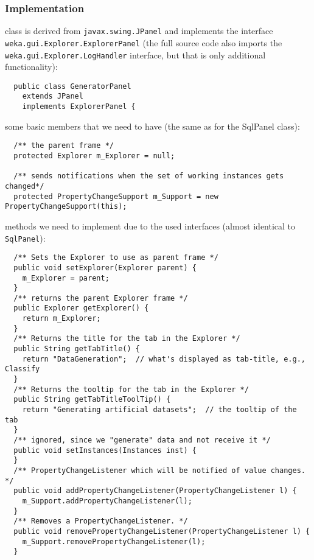 \subsubsection*{Implementation}
\begin{tight_itemize}
  \item class is derived from \texttt{javax.swing.JPanel} and implements the
interface \texttt{weka.gui.Explorer.ExplorerPanel} (the full source code also
imports the \texttt{weka.gui.Explorer.LogHandler} interface, but that is only
additional functionality):
  \begin{verbatim}
  public class GeneratorPanel
    extends JPanel
    implements ExplorerPanel {
  \end{verbatim}

  \item some basic members that we need to have (the same as for the SqlPanel
class):
  \begin{verbatim}
  /** the parent frame */
  protected Explorer m_Explorer = null;

  /** sends notifications when the set of working instances gets changed*/
  protected PropertyChangeSupport m_Support = new PropertyChangeSupport(this);
  \end{verbatim}

  \item methods we need to implement due to the used interfaces (almost
identical to \texttt{SqlPanel}):
  \begin{verbatim}
  /** Sets the Explorer to use as parent frame */
  public void setExplorer(Explorer parent) {
    m_Explorer = parent;
  }
  /** returns the parent Explorer frame */
  public Explorer getExplorer() {
    return m_Explorer;
  }
  /** Returns the title for the tab in the Explorer */
  public String getTabTitle() {
    return "DataGeneration";  // what's displayed as tab-title, e.g., Classify
  }
  /** Returns the tooltip for the tab in the Explorer */
  public String getTabTitleToolTip() {
    return "Generating artificial datasets";  // the tooltip of the tab
  }
  /** ignored, since we "generate" data and not receive it */
  public void setInstances(Instances inst) {
  }
  /** PropertyChangeListener which will be notified of value changes. */
  public void addPropertyChangeListener(PropertyChangeListener l) {
    m_Support.addPropertyChangeListener(l);
  }
  /** Removes a PropertyChangeListener. */
  public void removePropertyChangeListener(PropertyChangeListener l) {
    m_Support.removePropertyChangeListener(l);
  }
  \end{verbatim}


\end{tight_itemize}
